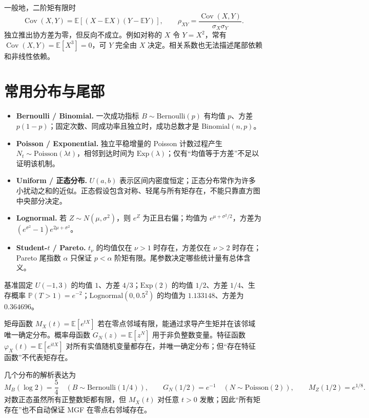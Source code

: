 一般地，二阶矩有限时
\[
 \operatorname{Cov}(X,Y)=\mathbb E[(X-\mathbb EX)(Y-\mathbb EY)],
 \qquad \rho_{XY}=\frac{\operatorname{Cov}(X,Y)}{\sigma_X\sigma_Y}.
\]
独立推出协方差为零，但反向不成立。例如对称的 $X$ 令 $Y=X^2$，常有 $\operatorname{Cov}(X,Y)=\mathbb E[X^3]=0$，可 $Y$ 完全由 $X$ 决定。相关系数也无法描述尾部依赖和非线性依赖。

\section{常用分布与尾部}

\begin{itemize}
  \item \textbf{Bernoulli / Binomial.} 一次成功指标 $B\sim\mathrm{Bernoulli}(p)$ 有均值 $p$、方差 $p(1-p)$；固定次数、同成功率且独立时，成功总数才是 $\mathrm{Binomial}(n,p)$。
  \item \textbf{Poisson / Exponential.} 独立平稳增量的 Poisson 计数过程产生 $N_t\sim\mathrm{Poisson}(\lambda t)$，相邻到达时间为 $\mathrm{Exp}(\lambda)$；仅有“均值等于方差”不足以证明该机制。
  \item \textbf{Uniform / 正态分布.} $U(a,b)$ 表示区间内密度恒定；正态分布常作为许多小扰动之和的近似。正态假设包含对称、轻尾与所有矩存在，不能只靠直方图中央部分决定。
  \item \textbf{Lognormal.} 若 $Z\sim N(\mu,\sigma^2)$，则 $e^Z$ 为正且右偏；均值为 $e^{\mu+\sigma^2/2}$，方差为 $(e^{\sigma^2}-1)e^{2\mu+\sigma^2}$。
  \item \textbf{Student-$t$ / Pareto.} $t_\nu$ 的均值仅在 $\nu>1$ 时存在，方差仅在 $\nu>2$ 时存在；Pareto 尾指数 $\alpha$ 只保证 $p<\alpha$ 阶矩有限。尾参数决定哪些统计量有总体含义。
\end{itemize}

基准固定 $U(-1,3)$ 的均值 $1$、方差 $4/3$；$\mathrm{Exp}(2)$ 的均值 $1/2$、方差 $1/4$、生存概率 $\mathbb P(T>1)=e^{-2}$；$\mathrm{Lognormal}(0,0.5^2)$ 的均值为 $1.133148$、方差为 $0.364696$。


矩母函数 $M_X(t)=\mathbb E[e^{tX}]$ 若在零点邻域有限，能通过求导产生矩并在该邻域唯一确定分布。概率母函数 $G_N(z)=\mathbb E[z^N]$ 用于非负整数变量。特征函数 $\varphi_X(t)=\mathbb E[e^{itX}]$ 对所有实值随机变量都存在，并唯一确定分布；但“存在特征函数”不代表矩存在。

几个分布的解析表达为
\[
 M_B(\log2)=\frac54\quad(B\sim\mathrm{Bernoulli}(1/4)),\qquad
 G_N(1/2)=e^{-1}\quad(N\sim\mathrm{Poisson}(2)),
 \qquad M_Z(1/2)=e^{1/8}.
\]
对数正态虽然所有正整数矩都有限，但 $M_X(t)$ 对任意 $t>0$ 发散；因此“所有矩存在”也不自动保证 MGF 在零点右邻域存在。

